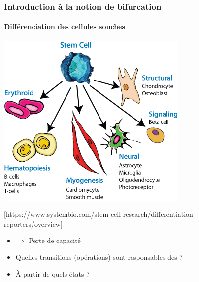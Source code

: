 \begin{frame}[c]
  \frametitle{Introduction à la notion de bifurcation}
 \framesubtitle{Différenciation des cellules souches}

\begin{center}
  \includegraphics[scale=0.42]{images/illustration_differentiation.png}
\end{center}
\begin{center}
{\tiny \color{darkgreen} [https://www.systembio.com/stem-cell-research/differentiation-reporters/overview]}
\end{center}

\begin{itemize}
\item {} $\Longrightarrow$ Perte de capacité %
\item Quelles transitions (opérations) sont responsables des  ? 
\item \`A partir de quels états ?
\end{itemize}
\end{frame}

